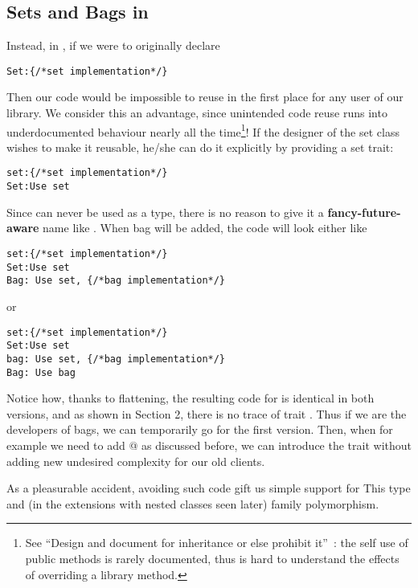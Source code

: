 \subsection{Sets and Bags in \name}
Instead, in \name, if we were to originally declare
\saveSpace\begin{lstlisting}
Set:{/*set implementation*/} 
\end{lstlisting}\saveSpace
Then our code would be impossible to reuse in the first place for any user of our library.
We consider this an advantage, since unintended code reuse runs into underdocumented behaviour nearly all the time\footnote{See
``Design and document for inheritance or else prohibit
it''~\cite{Bloch08}: the
self use of public methods is rarely documented, thus is hard to understand the effects of overriding a library method.
}!
If the designer of the set class wishes to make it reusable, he/she can do it explicitly by providing a set trait:
\saveSpace\begin{lstlisting}
set:{/*set implementation*/} 
Set:Use set
\end{lstlisting}\saveSpace
Since \Q@set@ can never be used as a type, there is no reason to give it a {\bf fancy-future-aware} name like
\Q@AbstractSetOrBag@.
When bag will be added, the code will look either like
\saveSpace\begin{lstlisting}
set:{/*set implementation*/} 
Set:Use set
Bag: Use set, {/*bag implementation*/}
\end{lstlisting}\saveSpace\saveSpace
or 
\saveSpace\saveSpace\begin{lstlisting}
set:{/*set implementation*/} 
Set:Use set
bag: Use set, {/*bag implementation*/}
Bag: Use bag
\end{lstlisting}\saveSpace
Notice how, thanks to flattening, the resulting code for \Q@Bag@ is identical in both versions, 
and as shown in Section 2, there is no trace of trait \Q@bag@. 
Thus if we are the developers of bags, we can temporarily go for the first version.
Then, when for example we need to add @ as discussed before,
we can introduce the \Q@bag@ trait without adding new undesired complexity for our old clients.


As a pleasurable accident, avoiding such code gift us simple support for
This type and (in the extensions with nested classes seen later)
family polymorphism.

